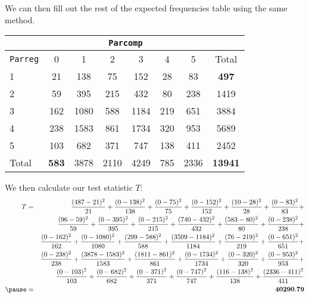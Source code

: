 \documentclass{beamer}
\begin{document}
\begin{frame}
We can then fill out the rest of the expected frequencies table using
the same method.
\pause
\footnotesize
\begin{table}
\begin{center}
\begin{tabular}{l|cccccc|c}
& \multicolumn{6}{c}{{\tt Parcomp}} & \\
\hline
{\tt Parreg} & 0 & 1 & 2 & 3 & 4 & 5 & Total\\
\hline
1 & 21 & 138 & 75 & 152 & 28 & 83 & \textbf{497} \\
2 & 59 & 395 & 215 & 432 & 80 & 238 & 1419\\
3 & 162 & 1080 & 588 & 1184 & 219 & 651 & 3884\\
4 & 238 & 1583 & 861 & 1734 & 320 & 953 & 5689\\
5 & 103 & 682 & 371 & 747 & 138 & 411 & 2452\\
\hline
Total & \textbf{583} & 3878 & 2110 & 4249 & 785 & 2336 & \textbf{13941}\\
\end{tabular}
\end{center}
\end{table}
\normalsize
\end{frame}

\begin{frame}[fragile]
We then calculate our test statistic $T$:
\pause
\tiny
\begin{eqnarray*}
T &=& \frac{(487-21)^2}{21} + \frac{(0-138)^2}{138} +
\frac{(0-75)^2}{75} + \frac{(0-152)^2}{152} + \frac{(10-28)^2}{28} +
\frac{(0-83)^2}{83} + \\
&\phantom{=}& \frac{(96-59)^2}{59} + \frac{(0-395)^2}{395} +
\frac{(0-215)^2}{215} + \frac{(740-432)^2}{432} + \frac{(583-80)^2}{80} +
\frac{(0-238)^2}{238} + \\
&\phantom{=}& \frac{(0-162)^2}{162} + \frac{(0-1080)^2}{1080} +
\frac{(299-588)^2}{588} + \frac{(3509-1184)^2}{1184} + \frac{(76-219)^2}{219} +
\frac{(0-651)^2}{651} + \\
&\phantom{=}& \frac{(0-238)^2}{238} + \frac{(3878-1583)^2}{1583} +
\frac{(1811-861)^2}{861} + \frac{(0-1734)^2}{1734} + \frac{(0-320)^2}{320} +
\frac{(0-953)^2}{953} + \\
&\phantom{=}& \frac{(0-103)^2}{103} + \frac{(0-682)^2}{682} +
\frac{(0-371)^2}{371} + \frac{(0-747)^2}{747} + \frac{(116-138)^2}{138} +
\frac{(2336-411)^2}{411} \\
\pause
&=& \mathbf{40290.79}
\end{eqnarray*}
\normalsize
\end{frame}
\end{document}
